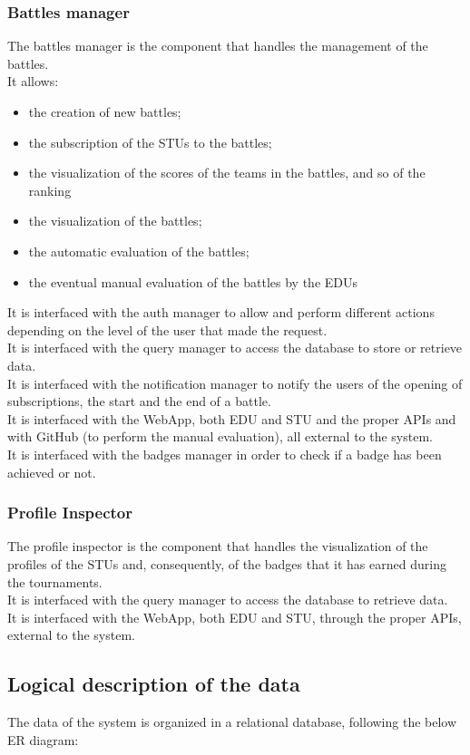 \subsubsection*{Battles manager}
The battles manager is the component that handles the management of the battles.\\
It allows:
\begin{itemize}
    \item the creation of new battles;
    \item the subscription of the STUs to the battles;
    \item the visualization of the scores of the teams in the battles, and so of the ranking
    \item the visualization of the battles;
    \item the automatic evaluation of the battles;
    \item the eventual manual evaluation of the battles by the EDUs
\end{itemize}
It is interfaced with the auth manager to allow and perform different actions depending on the level of the user that made the request. \\
It is interfaced with the query manager to access the database to store or retrieve data. \\
It is interfaced with the notification manager to notify the users of the opening of subscriptions, the start and the end of a battle.\\
It is interfaced with the WebApp, both EDU and STU and the proper APIs and with GitHub (to perform the manual evaluation), all external to the system. \\
It is interfaced with the badges manager in order to check if a badge has been achieved or not.

\subsubsection*{Profile Inspector}
The profile inspector is the component that handles the visualization of the profiles of the STUs and, consequently, of the badges that it has earned during the tournaments. \\
It is interfaced with the query manager to access the database to retrieve data. \\
It is interfaced with the WebApp, both EDU and STU, through the proper APIs, external to the system.

\subsection{Logical description of the data}
The data of the system is organized in a relational database, following the below ER diagram:

